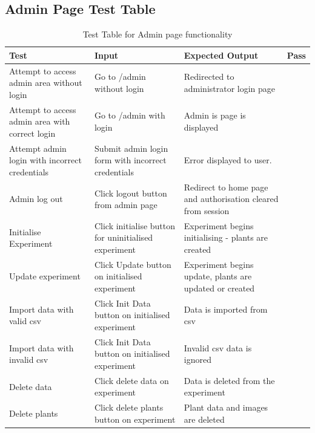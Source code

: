 \subsection{Admin Page Test Table}
\begin{table}[H]
\centering
\begin{tabular}{ | p{4cm} | p{4cm} |p{4cm} | p{1cm} | }
\hline
	\textbf{Test} & \textbf{Input} & \textbf{Expected Output} & \textbf{Pass} \\ \hline
	Attempt to access admin area without login & Go to /admin without login & Redirected to administrator login page & \checkmark \\ \hline
	Attempt to access admin area with correct login & Go to /admin with login & Admin is page is displayed & \checkmark \\ \hline
	Attempt admin login with incorrect credentials & Submit admin login form with incorrect credentials & Error displayed to user. & \checkmark \\ \hline
	Admin log out & Click logout button from admin page & Redirect to home page and authorisation cleared from session & \checkmark \\ \hline
	Initialise Experiment & Click initialise button for uninitialised experiment & Experiment begins initialising - plants are created & \checkmark \\ \hline
	Update experiment & Click Update button on initialised experiment & Experiment begins update, plants are updated or created & \checkmark \\ \hline
	Import data with valid csv & Click Init Data button on initialised experiment & Data is imported from csv & \checkmark \\ \hline
	Import data with invalid csv & Click Init Data button on initialised experiment & Invalid csv data is ignored & \checkmark \\ \hline
	Delete data & Click delete data on experiment & Data is deleted from the experiment & \checkmark \\ \hline
	Delete plants & Click delete plants button on experiment & Plant data and images are deleted & \checkmark \\ \hline
\end{tabular}
\caption{Test Table for Admin page functionality}
\label{test_table_admin}
\end{table}
